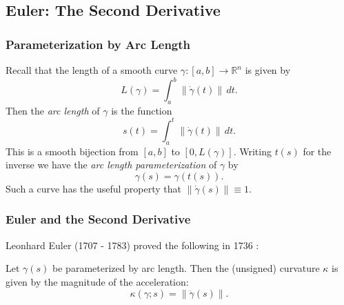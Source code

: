 \documentclass[handout]{beamer}
\newcommand{\R}{\mathbb{R}}
\newcommand{\norm}[1]{\left\lVert#1\right\rVert}
\theoremstyle{definition}
\begin{document}
\subsection{Euler: The Second Derivative}

\begin{frame}
    \frametitle{Parameterization by Arc Length}

    \pause
    Recall that the length of a smooth curve $\gamma : [a,b] \to \R^n$ is given by
    \[
        L(\gamma) = \int_a^b \norm{\dot\gamma(t)} \,dt.
    \]
    \pause
    Then the \emph{arc length} of $\gamma$ is the function
    \[
        s(t) = \int_a^t \norm{\dot\gamma(t)} \,dt.
    \]
    \pause
    This is a smooth bijection from $[a,b]$ to $[0,L(\gamma)]$. Writing $t(s)$ for the inverse
    we have the \emph{arc length parameterization} of $\gamma$ by
    \[
      \gamma(s) = \gamma(t(s)).
    \]
    Such a curve has the useful property that $\norm{\dot\gamma(s)} \equiv 1$.
\end{frame}

\begin{frame}
    \frametitle{Euler and the Second Derivative}

    \pause
    Leonhard Euler (1707 - 1783) proved the following in 1736 \cite{geom-diff-view}:

    \pause
    \begin{theorem}
        Let $\gamma(s)$ be parameterized by arc length. Then the (unsigned) curvature
        $\kappa$ is given by the magnitude of the acceleration:
        \[
          \kappa(\gamma;s) = \norm{\ddot\gamma(s)}.
        \]
    \end{theorem}
\end{frame}



\end{document}

